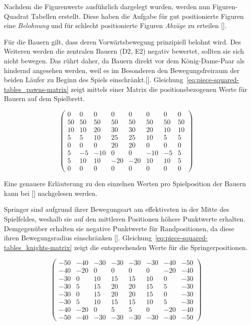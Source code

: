 Nachdem die Figurenwerte ausführlich dargelegt wurden, werden nun Figuren-Quadrat Tabellen erstellt.
Diese haben die Aufgabe für gut positionierte Figuren eine \textit{Belohnung} und für schlecht positionierte Figuren \textit{Abzüge} zu erteilen [\cite{Wiki2018}].

Für die Bauern gilt, dass deren Vorwärtsbewegung prinzipiell belohnt wird.
Des Weiteren werden die zentralen Bauern (D2, E2) negativ bewertet, sollten sie sich nicht bewegen.
Das rührt daher, da Bauern direkt vor dem König-Dame-Paar als hindernd angesehen werden, weil es im Besonderen den Bewegungsfreiraum der beiden Läufer zu Beginn des Spiels einschränkt.[\cite{Wiki2018}].
Gleichung~\ref{eq:piece-squared-tables_pawns-matrix} zeigt mittels einer Matrix die positionsbezogenen Werte für Bauern auf dem Spielbrett.

\begin{equation} \label{eq:piece-squared-tables_pawns-matrix}
\begin{pmatrix}
0 & 0 & 0 & 0 & 0 & 0 & 0 & 0 \\
50 & 50 & 50 & 50 & 50 & 50 & 50 & 50 \\
10 & 10 & 20 & 30 & 30 & 20 & 10 & 10 \\
5 & 5 & 10 & 25 & 25 & 10 & 5 & 5 \\
0 & 0 & 0 & 20 & 20 & 0 & 0 & 0 \\
5 & -5 & -10 & 0 & 0 & -10 & -5 & 5 \\
5 & 10 & 10 & -20 & -20 & 10 & 10 & 5 \\
0 & 0 & 0 & 0 & 0 & 0 & 0 & 0
\end{pmatrix}
\end{equation}

\bigskip

\noindent Eine genauere Erläuterung zu den einzelnen Werten pro Spielposition der Bauern kann bei [\cite{Wiki2018}] nachgelesen werden.

Springer sind aufgrund ihrer Bewegungsart am effektivsten in der Mitte des Spielfeldes, weshalb sie auf den mittleren Positionen höhere Punktwerte erhalten.
Demgegenüber erhalten sie negative Punktwerte für Randpositionen, da diese ihren Bewegungsradius einschränken [\cite{Wiki2018}].
Gleichung~\ref{eq:piece-squared-tables_knights-matrix} zeigt die entsprechenden Werte für die Springerpositionen.

\begin{equation} \label{eq:piece-squared-tables_knights-matrix}
\begin{pmatrix}
-50 & -40 & -30 & -30 & -30 & -30 & -40 & -50 \\
-40 & -20 & 0 & 0 & 0 & 0 & -20 & -40 \\
-30 & 0 & 10 & 15 & 15 & 10 & 0 & -30 \\
-30 & 5 & 15 & 20 & 20 & 15 & 5 & -30 \\
-30 & 0 & 15 & 20 & 20 & 15 & 0 & -30 \\
-30 & 5 & 10 & 15 & 15 & 10 & 5 & -30 \\
-40 & -20 & 0 & 5 & 5 & 0 & -20 & -40 \\
-50 & -40 & -30 & -30 & -30 & -30 & -40 & -50
\end{pmatrix}
\end{equation}

